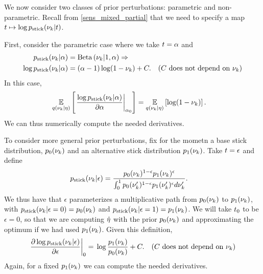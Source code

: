 We now consider two classes of prior perturbations: parametric and
non-parametric.  Recall from \eqref{sens_mixed_partial} that we
need to specify a map $t \mapsto \log p_{\mathrm{stick}}(\nu_{k} \vert t)$.

First, consider the parametric case where we take $t = \alpha$ and
%
\begin{align*}
%
\pstick(\nuk \vert \alpha) ={}&
    \betadist{\nuk \vert 1, \alpha} \Rightarrow\\
\log \pstick(\nuk \vert \alpha) ={}&
    (\alpha - 1) \log(1 - \nuk) + \const. &
    \constdesc{\nuk}
%
\end{align*}
%
In this case,
%
\begin{align*}
%
\expect{\q(\nuk \vert \eta)}
       {\fracat{\log \pstick(\nuk \vert \alpha)}{\partial \alpha}{\alpha_0}
} ={}&
    \expect{\q(\nuk \vert \eta)}{\log(1 - \nuk)}.
%
\end{align*}
%
We can thus numerically compute the needed derivatives.

To consider more general prior perturbations, fix for the mometn a base stick
distribution, $p_{0}(\nu_{k})$ and an alternative stick distribution
$p_{1}(\nu_{k})$.  Take $t = \epsilon$ and define
%
\begin{align*}
%
\pstick(\nuk \vert \epsilon) ={}&
\frac{\pb(\nuk)^{1 - \epsilon} \pa(\nuk)^\epsilon}
     {\int_0^1 \pb(\nuk')^{1 - \epsilon} \pa(\nuk')^\epsilon d\nuk'}.
%
\end{align*}
%
We thus have that $\epsilon$ parameterizes a multiplicative path from
$p_{0}(\nu_{k})$ to $p_{1}(\nu_{k})$, with $p_{\mathrm{stick}}(\nu_{k} \vert \epsilon = 0) = p_{0}(\nu_{k})$
and $p_{\mathrm{stick}}(\nu_{k} \vert \epsilon=1) = p_{1}(\nu_{k})$.  We will take
$t_0$ to be $\epsilon = 0$, so that we are computing $\hat\eta$ with the
prior $p_{0}(\nu_{k})$ and approximating the optimum if we had used $p_{1}(\nu_{k})$.
%
Given this definition,
%
\begin{align*}
%
\fracat{\partial \log \pstick(\nuk \vert \epsilon) }{\partial \epsilon}{0} ={}&
    \log \frac{\pa(\nuk)}{\pb(\nuk)} + \const.
    & \constdesc{\nuk}
%
\end{align*}
%
Again, for a fixed $p_{1}(\nu_{k})$ we can compute the needed derivatives.

